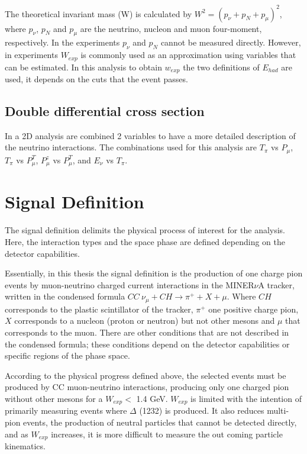 The theoretical invariant mass (W) is calculated by $W^2=(p_\nu+p_N+p_\mu)^2$, where $p_\nu$, $p_N$ and $p_\mu$ are the neutrino, nucleon and muon four-moment, respectively. In the experiments $p_\nu$ and $p_N$ cannot be measured directly. However, in experiments $W_{exp}$ is commonly used as an approximation using variables that can be estimated. In this analysis to obtain $w_{exp}$ the two definitions of $E_{had}$ are used, it depends on the cuts that the event passes.  

\subsection{Double differential cross section}
\label{Cap:Analysis:Variables:2DAnalysis}

In a 2D analysis are combined 2 variables to have a more detailed description of the neutrino interactions. The combinations used for this analysis are $T_\pi$ vs $P_\mu$, $T_\pi$ vs $P^T_\mu$, $P^z_\mu$ vs $P^T_\mu$, and $E_\nu$ vs $T_\pi$.




\section{Signal Definition}
\label{Cap:Analysis:SignalDefinition}

The signal definition delimits the physical process of interest for the analysis. Here, the interaction types and the space phase are defined depending on the detector capabilities.

Essentially, in this thesis the signal definition is the production of one charge pion events by muon-neutrino charged current interactions in the MINER$\nu$A tracker, written in the condensed formula $CC\ \nu_\mu+CH\xrightarrow{}\pi^+ + X + \mu$. Where $CH$ corresponds to the plastic scintillator of the tracker, $\pi^+$ one positive charge pion, $X$ corresponds to a nucleon (proton or neutron) but not other mesons and $\mu$ that corresponds to the muon. There are other conditions that are not described in the condensed formula; these conditions depend on the detector capabilities or specific regions of the phase space. 

According to the physical progress defined above, the selected events must be produced by CC muon-neutrino interactions, producing only one charged pion without other mesons for a $W_{exp} <$ 1.4 GeV. $W_{exp}$ is limited with the intention of primarily measuring events where $\Delta$ (1232) is produced. It also reduces multi-pion events, the production of neutral particles that cannot be detected directly, and as $W_{exp}$ increases, it is more difficult to measure the out coming particle kinematics. 

